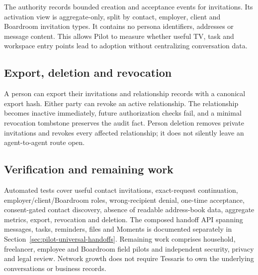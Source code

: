 The authority records bounded creation and acceptance events for invitations.
Its activation view is aggregate-only, split by contact, employer, client and
Boardroom invitation types.  It contains no persona identifiers, addresses or
message content.  This allows Pilot to measure whether useful TV, task and workspace
entry points lead to adoption without centralizing conversation data.

\subsection{Export, deletion and revocation}

A person can export their invitations and relationship records with a canonical
export hash.  Either party can revoke an active relationship.  The relationship
becomes inactive immediately, future authorization checks fail, and a minimal
revocation tombstone preserves the audit fact.  Person deletion removes private
invitations and revokes every affected relationship; it does not silently leave an
agent-to-agent route open.

\subsection{Verification and remaining work}

Automated tests cover useful contact invitations, exact-request continuation,
employer/client/Boardroom roles, wrong-recipient denial, one-time acceptance,
consent-gated contact discovery, absence of readable address-book data, aggregate
metrics, export, revocation and deletion.  The composed handoff API spanning
messages, tasks, reminders, files and Moments is documented separately in
Section~\ref{sec:pilot-universal-handoffs}.  Remaining work comprises household,
freelancer, employee and Boardroom field pilots and independent security, privacy
and legal review.  Network growth does not require Tessaris to own the underlying
conversations or business records.
